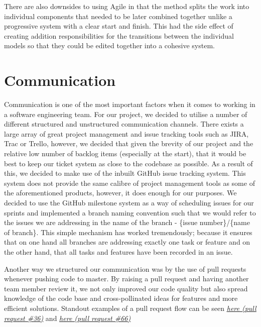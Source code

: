 \documentclass[a4paper]{report}
\begin{document}
	\par There are also downsides to using Agile in that the method splits the work into individual components that needed to be later combined together unlike a progressive system with a clear start and finish. This had the side effect of creating addition responsibilities for the transitions between the individual models so that they could be edited together into a cohesive system.
	
	
	
	\section{Communication}
	Communication is one of the most important factors when it comes to working in a software engineering team. For our project, we decided to utilise a number of different structured and unstructured communication channels. There exists a large array of great project management and issue tracking tools such as JIRA, Trac or Trello, however, we decided that given the brevity of our project and the relative low number of backlog items (especially at the start), that it would be best to keep our ticket system as close to the codebase as possible. As a result of this, we decided to make use of the inbuilt GitHub issue tracking system. This system does not provide the same calibre of project management tools as some of the aforementioned products, however, it does enough for our purposes. We decided to use the GitHub milestone system as a way of scheduling issues for our sprints and implemented a branch naming convention such that we would refer to the issues we are addressing in the name of the branch - \{issue number\}/\{name of branch\}. This simple mechanism has worked tremendously; because it ensures that on one hand all branches are addressing exactly one task or feature and on the other hand, that all tasks and features have been recorded in an issue. \newline
	\par Another way we structured our communication was by the use of pull requests whenever pushing code to master. By raising a pull request and having another team member review it, we not only improved our code quality but also spread knowledge of the code base and cross-pollinated ideas for features and more efficient solutions. Standout examples of a pull request flow can be seen \href{https://github.com/davidbenicek/raytracer/pull/36}{\underline{\textit{here (pull request \#36)}}} and \href{https://github.com/davidbenicek/raytracer/pull/66}{\underline{\textit{here (pull request \#66)}}}\newline
	
\end{document}
